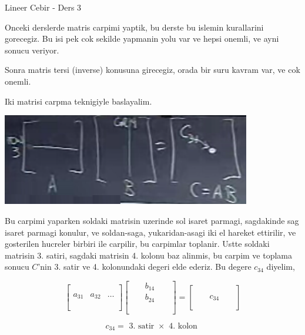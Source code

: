 \documentclass[12pt,fleqn]{article}\usepackage{../common}
\begin{document}
Lineer Cebir - Ders 3

Onceki derslerde matris carpimi yaptik, bu derste bu islemin kurallarini
gorecegiz. Bu isi pek cok sekilde yapmanin yolu var ve hepsi onemli, ve
ayni sonucu veriyor.

Sonra matris tersi (inverse) konusuna girecegiz, orada bir suru kavram var,
ve cok onemli. 

Iki matrisi carpma teknigiyle baslayalim. 

\includegraphics[height=4cm]{3_01.png}

Bu carpimi yaparken soldaki matrisin uzerinde sol isaret parmagi,
sagdakinde sag isaret parmagi konulur, ve soldan-saga, yukaridan-asagi iki
el hareket ettirilir, ve gosterilen hucreler birbiri ile carpilir, bu
carpimlar toplanir. Ustte soldaki matrisin 3. satiri, sagdaki matrisin
4. kolonu baz alinmis, bu carpim ve toplama sonucu $C$'nin 3. satir ve
4. kolonundaki degeri elde ederiz. Bu degere $c_{34}$ diyelim,

$$ 
\left[\begin{array}{rrrr}
\\
\\
a_{31} & a_{32} & \dots \\
\\
\\
\end{array}\right]
\left[\begin{array}{rrrrr}
& & b_{14} & & \\
& & b_{24} & & \\
& &  & & \\
& &  & & \\
& &  & & 
\end{array}\right] 
=
\left[\begin{array}{rrrrr}
& &  & & \\
& &  & & \\
& & c_{34} & & \\
& &  & & \\
& &  & & 
\end{array}\right]
$$

$$ c_{34} = \textrm{ 3. satir } \times \textrm{ 4. kolon } $$
\end{document}
